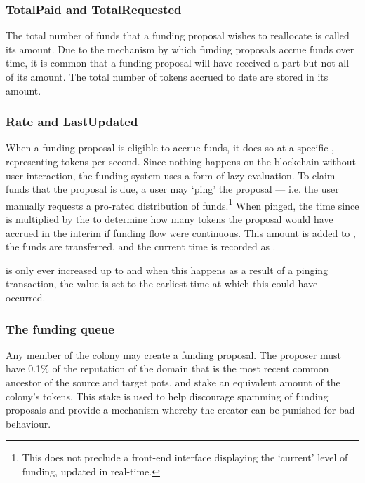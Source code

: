 \subsubsection*{TotalPaid and TotalRequested}
The total number of funds that a funding proposal wishes to reallocate is called its  amount. Due to the mechanism by which funding proposals accrue funds over time, it is common that a funding proposal will have received a part but not all of its  amount. The total number of tokens accrued to date are stored in its  amount.

\subsubsection*{Rate and LastUpdated}
When a funding proposal is eligible to accrue funds, it does so at a specific , representing tokens per second. Since nothing happens on the blockchain without user interaction, the funding system uses a form of lazy evaluation. To claim funds that the proposal is due, a user may `ping' the proposal --- i.e. the user manually requests a pro-rated distribution of funds.\footnote{This does not preclude a front-end interface displaying the `current' level of funding, updated in real-time.} When pinged, the time since  is multiplied by the  to determine how many tokens the proposal would have accrued in the interim if funding flow were continuous. This amount is added to , the funds are transferred, and the current time is recorded as .

 is only ever increased up to  and when this happens as a result of a pinging transaction, the  value is set to the earliest time at which this could have occurred.

\subsubsection{The funding queue}\label{subsec:funding-queue}
Any member of the colony may create a funding proposal. The proposer must have 0.1\% of the reputation of the domain that is the most recent common ancestor of the source and target pots, and stake an equivalent amount of the colony's tokens. This stake is used to help discourage spamming of funding proposals and provide a mechanism whereby the creator can be punished for bad behaviour.

